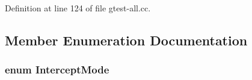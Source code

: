 \-Definition at line 124 of file gtest-\/all.\-cc.



\subsection{\-Member \-Enumeration \-Documentation}
\hypertarget{classtesting_1_1ScopedFakeTestPartResultReporter_a1d75549697022f869ab9d184916077d2}{
\subsubsection[{\-Intercept\-Mode}]{\setlength{\rightskip}{0pt plus 5cm}enum {\bf \-Intercept\-Mode}}}\label{df/d0c/classtesting_1_1ScopedFakeTestPartResultReporter_a1d75549697022f869ab9d184916077d2}
